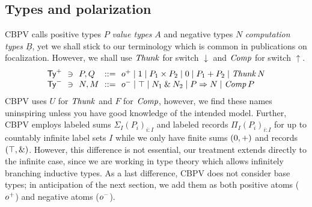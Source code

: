 \documentclass[sigplan,screen,fleqn]{acmart}
\begin{document}
\subsection{Types and polarization}

CBPV calls positive types $P$ \emph{value types} $A$ and negative
types $N$
\emph{computation types} $\underline B$,
yet we shall stick to our terminology
which is common in publications on focalization.
However, we shall use $\mathit{Thunk}$ for switch $\downarrow$ and $\mathit{Comp}$ for
switch $\uparrow$.
\[
\begin{array}{l@{~~}l@{~~}l@{~~}r@{~~}l}%
  \PTy & \ni & P,Q & ::= & \patom
    \mid \tyone \mid P_1 \times P_2
    \mid \tyzero \mid P_1 + P_2
    \mid \Thunk N
\\
  \NTy & \ni & N,M & ::= & \natom
    \mid \top \mid N_1 \ntimes N_2
    \mid P \To N
    \mid \Comp P
\\
\end{array}
\]
CBPV uses $U$ for $\mathit{Thunk}$ and $F$ for $\mathit{Comp}$, however, we find
these names uninspiring unless you have good knowledge of the intended
model.  Further, CBPV employs labeled sums $\Sigma_I (P_i)_{i : I}$
and labeled records $\Pi_I (P_i)_{i : I}$ for up to countably infinite
label sets $I$ while we only have finite sums $(0,+)$ and
records $(\top,\mathbin{\&})$.  However, this difference is not essential,
our treatment extends directly to the infinite case, since we are
working in type theory which allows infinitely branching inductive
types.   As a last difference, CBPV does not consider base types; in
anticipation of the next section, we add them as both positive atoms
($o^+$) and negative atoms ($o^-$).
\end{document}
